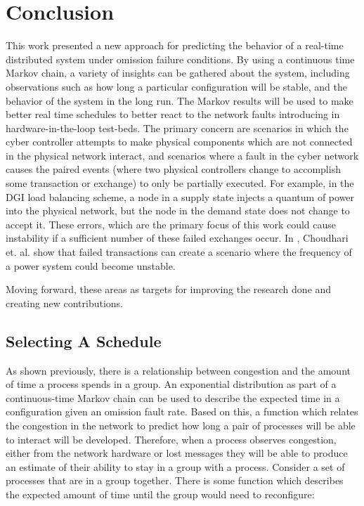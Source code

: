
\chapter{Conclusion}

This work presented a new approach for predicting the behavior of a real-time distributed system under omission failure conditions.
By using a continuous time Markov chain, a variety of insights can be gathered about the system, including observations such as how long a particular configuration will be stable, and the behavior of the system in the long run. 
The Markov results will be used  to make better real time schedules to better react to the network faults introducing in hardware-in-the-loop test-beds.
The primary concern are scenarios in which the cyber controller attempts to make physical components which are not connected in the physical network interact, and scenarios where a fault in the cyber network causes the paired events (where two physical controllers change to accomplish some transaction or exchange) to only be partially executed.
For example, in the DGI load balancing scheme, a node in a supply state injects a quantum of power into the physical network, but the node in the demand state does not change to accept it.
These errors, which are the primary focus of this work could cause instability if a sufficient number of these failed exchanges occur. In \cite{HARINI}, Choudhari et. al. show that failed transactions can create a scenario where the frequency of a power system could become unstable. 

Moving forward, these areas as targets for improving the research done and creating new contributions.

\section{Selecting A Schedule}

As shown previously, there is a relationship between congestion and the amount of time a process spends in a group.
An exponential distribution as part of a continuous-time Markov chain can be used to describe the expected time in a configuration given an omission fault rate.
Based on this, a function which relates the congestion in the network to predict how long a pair of processes will be able to interact will be developed.
Therefore, when a process observes congestion, either from the network hardware or lost messages they will be able to produce an estimate of their ability to stay in a group with a process.
Consider a set of processes that are in a group together.
There is some function which describes the expected amount of time until the group would need to reconfigure:

